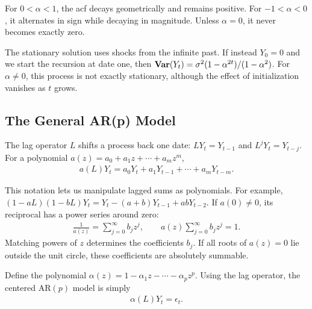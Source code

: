 \documentclass[a4paper,12pt]{article}
\begin{document}
\begin{remark}
	For $0<\alpha<1$, the \gls{acf} decays geometrically and remains positive.
	For $-1<\alpha<0$, it alternates in sign while decaying in magnitude.
	Unless $\alpha=0$, it never becomes exactly zero.
\end{remark}

\begin{remark}
	The stationary solution uses shocks from the infinite past.
	If instead $Y_0=0$ and we start the recursion at date one, then
	$\operatorname{\text{\textrm{\upshape\textbf{Var}}}}(Y_t)=\sigma^2(1-\alpha^{2t})/(1-\alpha^2)$.
	For $\alpha\neq0$, this process is not exactly stationary, although the effect of initialization vanishes as $t$ grows.
\end{remark}

\subsection{The General AR(p) Model}

\begin{definition}
	The lag operator $L$ shifts a process back one date:
	$LY_t=Y_{t-1}$ and $L^jY_t=Y_{t-j}$.
	For a polynomial $a(z)=a_0+a_1z+\cdots+a_mz^m$,
	\begin{align}
		a(L)Y_t=a_0Y_t+a_1Y_{t-1}+\cdots+a_mY_{t-m}.
	\end{align}
\end{definition}

\begin{remark}
	This notation lets us manipulate lagged sums as polynomials.
	For example, $(1-aL)(1-bL)Y_t=Y_t-(a+b)Y_{t-1}+abY_{t-2}$.
	If $a(0)\neq0$, its reciprocal has a power series around zero:
	\begin{align}
		\frac1{a(z)}=\sum_{j=0}^{\infty}b_jz^j,
		\qquad a(z)\sum_{j=0}^{\infty}b_jz^j=1.
	\end{align}
	Matching powers of $z$ determines the coefficients $b_j$.
	If all roots of $a(z)=0$ lie outside the unit circle, these coefficients are absolutely summable.
\end{remark}

\begin{remark}
	Define the polynomial $\alpha(z)=1-\alpha_1z-\cdots-\alpha_pz^p$.
	Using the lag operator, the centered $\mathrm{AR}(p)$ model is simply
	\begin{align}
		\alpha(L)Y_t=\epsilon_t.
	\end{align}
\end{remark}
\end{document}
